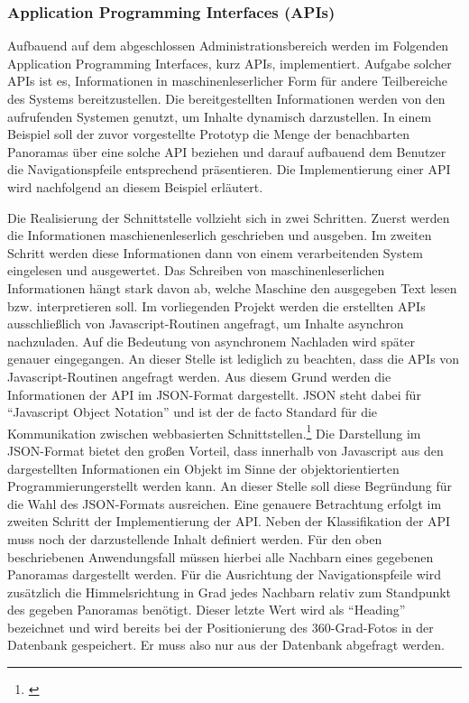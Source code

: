 \subsubsection{Application Programming Interfaces (APIs)}
\label{sec:APIs}

Aufbauend auf dem abgeschlossen Administrationsbereich werden im Folgenden
Application Programming Interfaces, kurz APIs, implementiert. Aufgabe solcher
APIs ist es, Informationen in maschinenleserlicher Form für andere Teilbereiche
des Systems bereitzustellen. Die bereitgestellten Informationen werden von den
aufrufenden Systemen genutzt, um Inhalte dynamisch darzustellen.
In einem Beispiel soll der zuvor vorgestellte Prototyp die Menge der
benachbarten Panoramas über eine solche API beziehen und darauf aufbauend dem
Benutzer die Navigationspfeile entsprechend präsentieren. Die Implementierung
einer API wird nachfolgend an diesem Beispiel erläutert.

Die Realisierung der Schnittstelle vollzieht sich in zwei Schritten.
Zuerst werden die Informationen maschienenleserlich geschrieben und ausgeben. Im
zweiten Schritt werden diese Informationen dann von einem verarbeitenden System
eingelesen und ausgewertet. Das Schreiben von maschinenleserlichen Informationen
hängt stark davon ab, welche Maschine den ausgegeben Text lesen bzw.
interpretieren soll. Im vorliegenden Projekt werden die erstellten APIs
ausschließlich von Javascript-Routinen angefragt, um Inhalte asynchron
nachzuladen. Auf die Bedeutung von asynchronem Nachladen wird später genauer
eingegangen. An dieser Stelle ist lediglich zu beachten, dass die APIs von
Javascript-Routinen angefragt werden. Aus diesem Grund werden die Informationen
der API im JSON-Format dargestellt. JSON steht dabei für "`Javascript Object
Notation"' und ist der de facto Standard für die Kommunikation zwischen
webbasierten Schnittstellen.\footnote{\citet[S.~20]{lubbers2011}} Die
Darstellung im JSON-Format bietet den großen Vorteil, dass innerhalb von
Javascript aus den dargestellten Informationen ein Objekt im Sinne der
objektorientierten Programmierung\footnotemark erstellt werden kann. An dieser
Stelle soll diese Begründung für die Wahl des JSON-Formats ausreichen. Eine
genauere Betrachtung erfolgt im zweiten Schritt der Implementierung der API.
Neben der Klassifikation der API muss noch der darzustellende Inhalt definiert
werden. Für den oben beschriebenen Anwendungsfall müssen hierbei alle Nachbarn
eines gegebenen Panoramas dargestellt werden. Für die Ausrichtung der
Navigationspfeile wird zusätzlich die Himmelsrichtung in Grad jedes Nachbarn
relativ zum Standpunkt des gegeben Panoramas benötigt. Dieser letzte Wert wird
als "`Heading"' bezeichnet und wird bereits bei der Positionierung des
360-Grad-Fotos in der Datenbank gespeichert. Er muss also nur aus der Datenbank
abgefragt werden.

